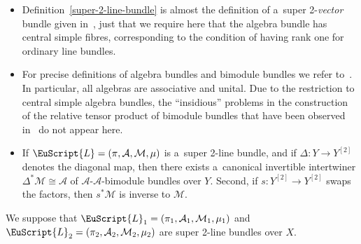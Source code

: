 \documentclass[pdftex]{sigma}
\numberwithin{equation}{section}
\def\mathscr#1{\EuScript{#1}}
\begin{document}
\begin{Remark}\quad
\begin{itemize}\itemsep=0pt
\item
Definition~\ref{super-2-line-bundle} is almost the definition of a~super 2-\emph{vector} bundle given in~\cite{Kristel2020}, just that we require here that the algebra bundle has central simple fibres, corresponding to the condition of having rank one for ordinary line bundles.
\item
For precise definitions of algebra bundles and bimodule bundles we refer to~\cite{Kristel2022}. In particular, all algebras are associative and unital. Due to the restriction to central simple algebra bundles, the ``insidious'' problems in the construction of the relative tensor product of bimodule bundles that have been observed in~\cite{Kristel2022} do not appear here.

\item
If $\mathscr{L}=(\pi,\mathcal{A},\mathcal{M},\mu)$ is a~super 2-line bundle, and if $\Delta\colon Y \to Y^{[2]}$ denotes the diagonal map, then there exists a~canonical invertible intertwiner $\Delta^{*}\mathcal{M} \cong \mathcal{A}$ of $\mathcal{A}$-$\mathcal{A}$-bimodule bundles over $Y$. Second, if $s\colon Y^{[2]} \to Y^{[2]}$ swaps the factors, then $s^{*}\mathcal{M}$ is inverse to $\mathcal{M}$.


\end{itemize}
\end{Remark}
We suppose that $\mathscr{L}_1=(\pi_1,\mathcal{A}_1,\mathcal{M}_1,\mu_1)$ and $\mathscr{L}_2=(\pi_2,\mathcal{A}_2,\mathcal{M}_2,\mu_2)$ are super 2-line bundles over $X$.
\end{document}

